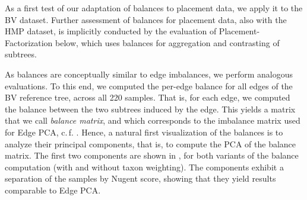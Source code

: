 As a first test of our adaptation of balances to placement data, we apply it to the \ac{BV} dataset.
Further assessment of balances for placement data, also with the \ac{HMP} dataset,
is implicitly conducted by the evaluation of Placement-Factorization below,
which uses balances for aggregation and contrasting of subtrees.

As balances are conceptually similar to edge imbalances, we perform analogous evaluations.
To this end, we computed the per-edge balance for all edges of the \ac{BV} reference tree, across all \num{220} samples.
That is, for each edge, we computed the balance between the two subtrees induced by the edge.
This yields a matrix that we call \emph{balance matrix},
and which corresponds to the imbalance matrix used for Edge PCA, c.\,f. .
Hence, a natural first visualization of the balances is to analyze their principal components,
that is, to compute the PCA of the balance matrix.
The first two components are shown in ,
for both variants of the balance computation (with and without taxon weighting).
The components exhibit a separation of the samples by Nugent score,
showing that they yield results comparable to Edge PCA.

